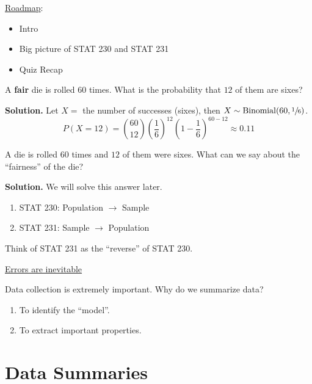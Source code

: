 \underline{Roadmap}:
\begin{itemize}
    \item Intro
    \item Big picture of STAT 230 and STAT 231
    \item Quiz Recap
\end{itemize}
\begin{exbox}
    \begin{example}[STAT 230]
        A \textbf{fair} die is rolled $ 60 $ times. What is the
        probability that $ 12 $ of them are sixes?
        
        \textbf{Solution.}
        Let $ X= $ the number of successes (sixes), then $ X \sim \operatorname{Binomial}(60,\sfrac{1}{6}) $.
        \[ P(X=12)
            =\binom{60}{12}\left( \frac{1}{6}  \right)^{12}\left( 1-\frac{1}{6} \right)^{60-12}
            \approx 0.11\]
    \end{example}
\end{exbox}
\begin{exbox}
    \begin{example}[STAT 231]
        A die is rolled $ 60 $ times and $ 12 $ of them were sixes.
        What can we say about the ``fairness'' of the die?
        
        \textbf{Solution.} We will solve this answer later.
    \end{example}
\end{exbox}
\begin{enumerate}
    \item STAT 230: Population $ \rightarrow $ Sample
    \item STAT 231: Sample $ \rightarrow $ Population
\end{enumerate}
Think of STAT 231 as the ``reverse'' of STAT 230.

\underline{Errors are inevitable}

Data collection is extremely important. Why do we summarize data?

\begin{enumerate}[label=(\alph*)]
    \item To identify the ``model''.
    \item To extract important properties.
\end{enumerate}

\section{Data Summaries}

